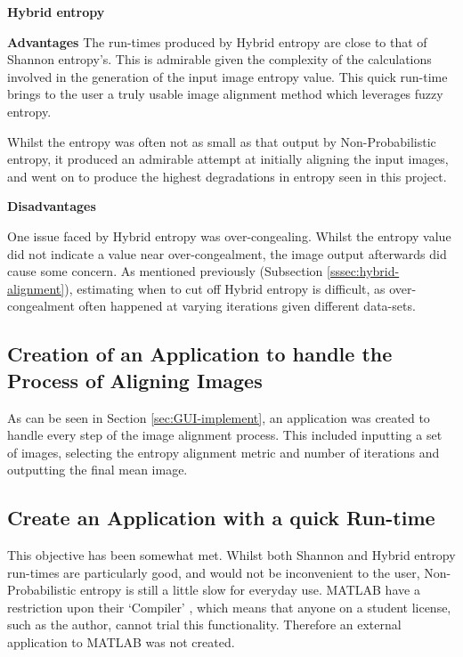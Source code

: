 \vspace{1cm}
\noindent \textbf{Hybrid entropy}

\noindent \textbf{Advantages}
The run-times produced by Hybrid entropy are close to that of Shannon entropy's. This is admirable given the complexity of the calculations involved in the generation of the input image entropy value. This quick run-time brings to the user a truly usable image alignment method which leverages fuzzy entropy.

Whilst the entropy was often not as small as that output by Non-Probabilistic entropy, it produced an admirable attempt at initially aligning the input images, and went on to produce the highest degradations in entropy seen in this project.

\noindent \textbf{Disadvantages}

One issue faced by Hybrid entropy was over-congealing. Whilst the entropy value did not indicate a value near over-congealment, the image output afterwards did cause some concern. As mentioned previously (Subsection \ref{sssec:hybrid-alignment}), estimating when to cut off Hybrid entropy is difficult, as over-congealment often happened at varying iterations given different data-sets.

\subsection{Creation of an Application to handle the Process of Aligning Images}

As can be seen in Section \ref{sec:GUI-implement}, an application was created to handle every step of the image alignment process. This included inputting a set of images, selecting the entropy alignment metric and number of iterations and outputting the final mean image.

\subsection{Create an Application with a quick Run-time}

This objective has been somewhat met. Whilst both Shannon and Hybrid entropy run-times are particularly good, and would not be inconvenient to the user, Non-Probabilistic entropy is still a little slow for everyday use. MATLAB have a restriction upon their `Compiler' \cite{compiler}, which means that anyone on a student license, such as the author, cannot trial this functionality. Therefore an external application to MATLAB was not created.


